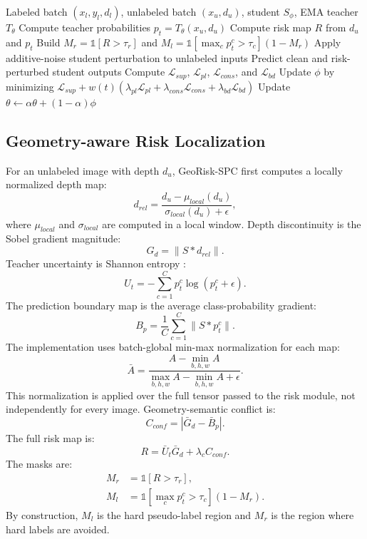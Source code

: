 \documentclass[journal]{IEEEtran}
\begin{document}
\begin{algorithm}[t]
\caption{GeoRisk-SPC Training}
\label{alg:georisk}
\begin{algorithmic}[1]
\REQUIRE Labeled batch $(x_l,y_l,d_l)$, unlabeled batch $(x_u,d_u)$, student $S_\phi$, EMA teacher $T_\theta$
\STATE Compute teacher probabilities $p_t=T_\theta(x_u,d_u)$
\STATE Compute risk map $R$ from $d_u$ and $p_t$
\STATE Build $M_r=\mathbb{1}[R>\tau_r]$ and $M_l=\mathbb{1}[\max_c p_t^c>\tau_c](1-M_r)$
\STATE Apply additive-noise student perturbation to unlabeled inputs
\STATE Predict clean and risk-perturbed student outputs
\STATE Compute $\mathcal{L}_{sup}$, $\mathcal{L}_{pl}$, $\mathcal{L}_{cons}$, and $\mathcal{L}_{bd}$
\STATE Update $\phi$ by minimizing $\mathcal{L}_{sup}+w(t)(\lambda_{pl}\mathcal{L}_{pl}+\lambda_{cons}\mathcal{L}_{cons}+\lambda_{bd}\mathcal{L}_{bd})$
\STATE Update $\theta\leftarrow\alpha\theta+(1-\alpha)\phi$
\end{algorithmic}
\end{algorithm}

\subsection{Geometry-aware Risk Localization}
For an unlabeled image with depth $d_u$, GeoRisk-SPC first computes a locally normalized depth map:
\begin{equation}
d_{rel}=\frac{d_u-\mu_{local}(d_u)}{\sigma_{local}(d_u)+\epsilon},
\end{equation}
where $\mu_{local}$ and $\sigma_{local}$ are computed in a local window. Depth discontinuity is the Sobel \cite{sobel1968} gradient magnitude:
\begin{equation}
G_d=\|S*d_{rel}\|.
\end{equation}
Teacher uncertainty is Shannon entropy \cite{shannon1948}:
\begin{equation}
U_t=-\sum_{c=1}^{C}p_t^c\log(p_t^c+\epsilon).
\end{equation}
The prediction boundary map is the average class-probability gradient:
\begin{equation}
B_p=\frac{1}{C}\sum_{c=1}^{C}\|S*p_t^c\|.
\end{equation}
The implementation uses batch-global min-max normalization for each map:
\begin{equation}
\bar{A}=\frac{A-\min_{b,h,w}A}{\max_{b,h,w}A-\min_{b,h,w}A+\epsilon}.
\end{equation}
This normalization is applied over the full tensor passed to the risk module, not independently for every image. Geometry-semantic conflict is:
\begin{equation}
C_{conf}=|\bar{G}_d-\bar{B}_p|.
\end{equation}
The full risk map is:
\begin{equation}
R=\bar{U}_t\bar{G}_d+\lambda_c C_{conf}.
\end{equation}
The masks are:
\begin{align}
M_r&=\mathbb{1}[R>\tau_r],\\
M_l&=\mathbb{1}[\max_c p_t^c>\tau_c](1-M_r).
\end{align}
By construction, $M_l$ is the hard pseudo-label region and $M_r$ is the region where hard labels are avoided.
\end{document}
